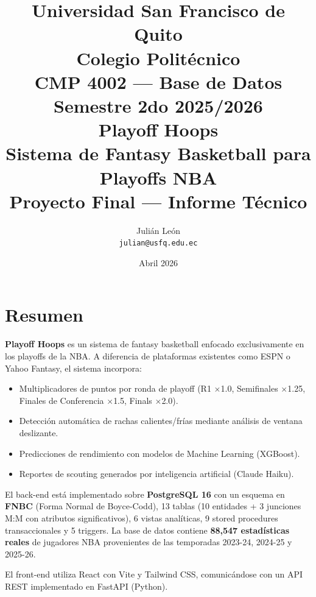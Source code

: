 \documentclass[12pt,a4paper]{article}
\title{
    \vspace{-1cm}
    {\Large \textbf{Universidad San Francisco de Quito}}\\
    {\large Colegio Polit\'ecnico}\\[0.3cm]
    {\normalsize CMP 4002 --- Base de Datos}\\
    {\normalsize Semestre 2do 2025/2026}\\[0.8cm]
    {\LARGE \textbf{Playoff Hoops}}\\[0.2cm]
    {\large Sistema de Fantasy Basketball para Playoffs NBA}\\[0.5cm]
    {\normalsize Proyecto Final --- Informe T\'ecnico}
}
\author{
    Juli\'an Le\'on\\
    \texttt{julian@usfq.edu.ec}
}
\date{Abril 2026}
\begin{document}
\maketitle
\thispagestyle{empty}
\newpage

\tableofcontents
\newpage

\section{Resumen}

\textbf{Playoff Hoops} es un sistema de fantasy basketball enfocado exclusivamente en los playoffs de la NBA.
A diferencia de plataformas existentes como ESPN o Yahoo Fantasy, el sistema incorpora:
\begin{itemize}[nosep]
    \item Multiplicadores de puntos por ronda de playoff (R1 $\times$1.0, Semifinales $\times$1.25, Finales de Conferencia $\times$1.5, Finals $\times$2.0).
    \item Detecci\'on autom\'atica de rachas calientes/fr\'ias mediante an\'alisis de ventana deslizante.
    \item Predicciones de rendimiento con modelos de Machine Learning (XGBoost).
    \item Reportes de scouting generados por inteligencia artificial (Claude Haiku).
\end{itemize}

El back-end est\'a implementado sobre \textbf{PostgreSQL 16} con un esquema en \textbf{FNBC} (Forma Normal de Boyce-Codd),
13 tablas (10 entidades + 3 junciones M:M con atributos significativos), 6 vistas anal\'iticas, 9 stored procedures
transaccionales y 5 triggers. La base de datos contiene \textbf{88,547 estad\'isticas reales} de jugadores NBA
provenientes de las temporadas 2023-24, 2024-25 y 2025-26.

El front-end utiliza React con Vite y Tailwind CSS, comunicándose con un API REST implementado en FastAPI (Python).

\end{document}
